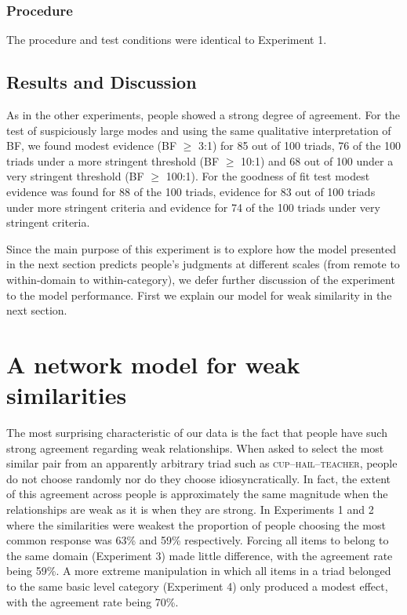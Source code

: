 \documentclass[doc]{apa6}
\newcommand{\stimulus}[1]{\textsc{#1}}
\begin{document}
\subsubsection{Procedure} The procedure and test conditions were identical to Experiment 1.

\subsection{Results and Discussion}

As in the other experiments, people showed a strong degree of agreement.  For the test of suspiciously large modes and using the same qualitative interpretation of BF, we found modest evidence (BF $\geq$ 3:1) for 85 out of 100 triads, 76 of the 100 triads under a more stringent threshold (BF $\geq$ 10:1) and 68 out of 100 under a very stringent threshold (BF $\geq$ 100:1).
For the goodness of fit test modest evidence was found for 88 of the 100 triads, evidence for 83 out of 100 triads under more stringent criteria and evidence for 74 of the 100 triads under very stringent criteria.

Since the main purpose of this experiment is to explore how the model presented in the next section predicts people's judgments at different scales (from remote to within-domain to within-category), we defer further discussion of the experiment to the model performance. First we explain our model for weak similarity in the next section.




\section{A network model for weak similarities}
The most surprising characteristic of our data is the fact that people have such strong agreement regarding weak relationships. When asked to select the most similar pair from an apparently arbitrary triad such as \stimulus{cup}--\stimulus{hail}--\stimulus{teacher}, people do not choose randomly nor do they choose idiosyncratically. In fact, the extent of this agreement across people is approximately the same magnitude when the relationships are weak as it is when they are strong. In Experiments 1 and 2 where the similarities were weakest the proportion of people choosing the most common response was 63\% and 59\% respectively. Forcing all items to belong to the same domain (Experiment 3) made little difference, with the agreement rate being 59\%. A more extreme manipulation in which all items in a triad belonged to the same basic level category (Experiment 4) only produced a modest effect, with the agreement rate being 70\%.
\end{document}
